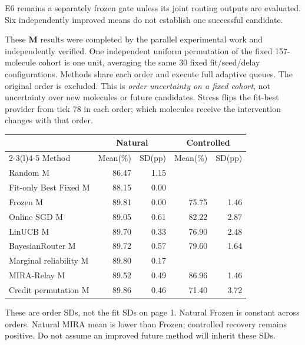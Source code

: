 \documentclass[10pt,letterpaper]{article}
\newcommand{\NA}{\textemdash}
\newcommand{\note}[1]{{\fontsize{8.5}{10.5}\selectfont #1\par}}
\newcommand{\sect}[1]{\vspace{5pt}{\large\bfseries #1}\par\vspace{2pt}}
\newenvironment{clean}{\begin{center}\fontsize{9.5}{11.5}\selectfont\setlength{\tabcolsep}{6pt}\renewcommand{\arraystretch}{1.06}}{\end{center}}
\begin{document}
E6 remains a separately frozen gate unless its joint routing outputs are evaluated. Six independently improved means do not establish one successful candidate.
\newpage
\sect{E1--E2: measured distribution over 128 arrival orders}
These \textbf{M} results were completed by the parallel experimental work and independently verified.
One independent uniform permutation of the fixed 157-molecule cohort is one unit, averaging
the same 30 fixed fit/seed/delay configurations. Methods share each order and execute full
adaptive queues. The original order is excluded. This is \emph{order uncertainty on a fixed cohort},
not uncertainty over new molecules or future candidates. Stress flips the fit-best provider from tick 78
in each order; which molecules receive the intervention changes with that order.
\par\noindent\begin{minipage}{\linewidth}\end{minipage}\par
\begin{clean}\begin{tabular}{@{}lrrrr@{}}
\toprule
& \multicolumn{2}{c}{Natural} & \multicolumn{2}{c}{Controlled} \\ \cmidrule(lr){2-3}\cmidrule(l){4-5} Method & Mean(\%) & SD(pp) & Mean(\%) & SD(pp) \\
\midrule
Random M & 86.47 & 1.15 & \NA & \NA \\
Fit-only Best Fixed M & 88.15 & 0.00 & \NA & \NA \\
Frozen M & 89.81 & 0.00 & 75.75 & 1.46 \\
Online SGD M & 89.05 & 0.61 & 82.22 & 2.87 \\
LinUCB M & 89.70 & 0.33 & 76.90 & 2.48 \\
BayesianRouter M & 89.72 & 0.57 & 79.60 & 1.64 \\
Marginal reliability M & 89.80 & 0.17 & \NA & \NA \\
MIRA-Relay M & 89.52 & 0.49 & 86.96 & 1.46 \\
Credit permutation M & 89.86 & 0.46 & 71.40 & 3.72 \\
\bottomrule\end{tabular}\end{clean}
\note{These are order SDs, not the fit SDs on page 1. Natural Frozen is constant across orders. Natural MIRA mean is lower than Frozen; controlled recovery remains positive. Do not assume an improved future method will inherit these SDs.}
\end{document}

